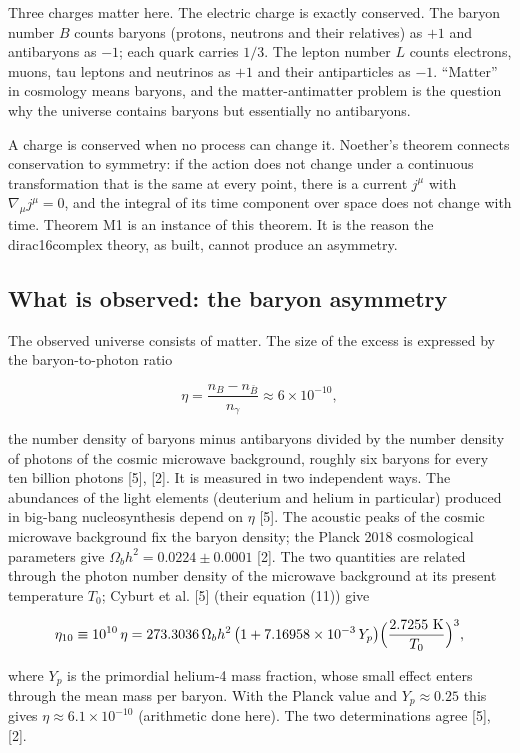 \documentclass[11pt]{article}
\begin{document}
Three charges matter here. The electric charge is exactly conserved. The baryon number $B$ counts baryons (protons, neutrons and their relatives) as $+1$ and antibaryons as $-1$; each quark carries $1/3$. The lepton number $L$ counts electrons, muons, tau leptons and neutrinos as $+1$ and their antiparticles as $-1$. ``Matter'' in cosmology means baryons, and the matter-antimatter problem is the question why the universe contains baryons but essentially no antibaryons.

A charge is conserved when no process can change it. Noether's theorem connects conservation to symmetry: if the action does not change under a continuous transformation that is the same at every point, there is a current $j^\mu$ with $\nabla_\mu j^\mu=0$, and the integral of its time component over space does not change with time. Theorem M1 is an instance of this theorem. It is the reason the dirac16complex theory, as built, cannot produce an asymmetry.

\subsection{What is observed: the baryon asymmetry}

The observed universe consists of matter. The size of the excess is expressed by the baryon-to-photon ratio

\[
\eta=\frac{n_B-n_{\bar B}}{n_\gamma}\approx6\times10^{-10},
\]

the number density of baryons minus antibaryons divided by the number density of photons of the cosmic microwave background, roughly six baryons for every ten billion photons [5], [2]. It is measured in two independent ways. The abundances of the light elements (deuterium and helium in particular) produced in big-bang nucleosynthesis depend on $\eta$ [5]. The acoustic peaks of the cosmic microwave background fix the baryon density; the Planck 2018 cosmological parameters give $\Omega_bh^2=0.0224\pm0.0001$ [2]. The two quantities are related through the photon number density of the microwave background at its present temperature $T_0$; Cyburt et al. [5] (their equation (11)) give

\[
\eta_{10}\equiv10^{10}\,\eta=273.3036\,\Omega_bh^2\,\bigl(1+7.16958\times10^{-3}\,Y_p\bigr)\Bigl(\frac{2.7255\ \mathrm K}{T_0}\Bigr)^3,
\]

where $Y_p$ is the primordial helium-4 mass fraction, whose small effect enters through the mean mass per baryon. With the Planck value and $Y_p\approx0.25$ this gives $\eta\approx6.1\times10^{-10}$ (arithmetic done here). The two determinations agree [5], [2].
\end{document}
